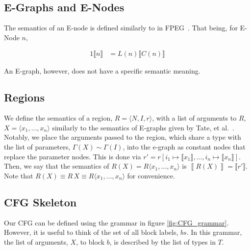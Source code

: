 \documentclass{article}
\begin{document}
\subsection{E-Graphs and E-Nodes}

The semantics of an E-node is defined similarly to in FPEG~\cite{dellaneve_2023}. That being, for E-Node $n$,

\begin{alignat*}{1}
  \llbracket n \rrbracket &= L(n) \llbracket C(n) \rrbracket
\end{alignat*}


An E-graph, however, does not have a specific semantic meaning.


\subsection{Regions}

We define the semantics of a region, $R = \langle N, I, r \rangle$, with a list of arguments to $R$, $X = \langle x_1, \dots, x_n \rangle$ similarly to the semantics of E-graphs given by Tate, et al.~\cite{eqsat-lmcs}. Notably, we place the arguments passed to the region, which share a type with the list of parameters, $\Gamma (X) \sim  \Gamma (I)$, into the e-graph as constant nodes that replace the parameter nodes. This is done via $r' = r[i_1 \mapsto \llbracket x_1 \rrbracket, \dots, i_n \mapsto \llbracket x_n \rrbracket]$. Then, we say that the semantics of $R (X) = R \langle x_1, \dots, x_n \rangle$ is $\left \llbracket R (X) \right \rrbracket = \llbracket r' \rrbracket$. Note that $R (X) \equiv R\, X \equiv R \langle x_1, \dots, x_n \rangle$ for convenience.


\subsection{CFG Skeleton}

Our CFG can be defined using the grammar in figure \ref{fig:CFG_grammar}. However, it is useful to think of the set of all block labels, $bs$. In this grammar, the list of arguments, $X$, to block $b$, is described by the list of types in $T$.
\end{document}
